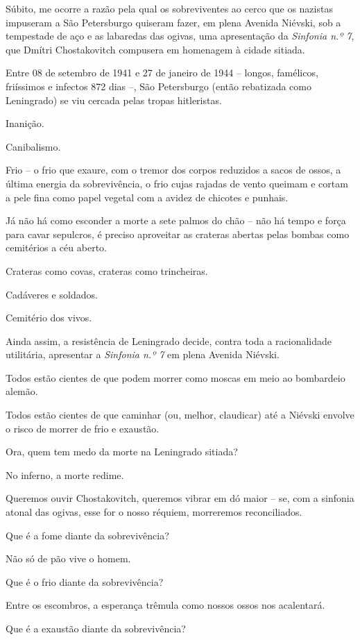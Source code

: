 Súbito, me ocorre a razão pela qual os sobreviventes ao cerco que os
nazistas impuseram a São Petersburgo quiseram fazer, em plena Avenida
Niévski, sob a tempestade de aço e as labaredas das ogivas, uma
apresentação da \emph{Sinfonia n.º 7}, que Dmítri Chostakovitch
compusera em homenagem à cidade sitiada.

Entre 08 de setembro de 1941 e 27 de janeiro de 1944 -- longos,
famélicos, friíssimos e infectos 872 dias --, São Petersburgo (então
rebatizada como Leningrado) se viu cercada pelas tropas hitleristas.

Inanição.

Canibalismo.

Frio -- o frio que exaure, com o tremor dos corpos reduzidos a sacos de
ossos, a última energia da sobrevivência, o frio cujas rajadas de vento
queimam e cortam a pele fina como papel vegetal com a avidez de chicotes
e punhais.

Já não há como esconder a morte a sete palmos do chão -- não há tempo e
força para cavar sepulcros, é preciso aproveitar as crateras abertas
pelas bombas como cemitérios a céu aberto.

Crateras como covas, crateras como trincheiras.

Cadáveres e soldados.

Cemitério dos vivos.

Ainda assim, a resistência de Leningrado decide, contra toda a
racionalidade utilitária, apresentar a \emph{Sinfonia n.º 7} em plena
Avenida Niévski.

Todos estão cientes de que podem morrer como moscas em meio ao
bombardeio alemão.

Todos estão cientes de que caminhar (ou, melhor, claudicar) até a
Niévski envolve o risco de morrer de frio e exaustão.

Ora, quem tem medo da morte na Leningrado sitiada?

No inferno, a morte redime.

Queremos ouvir Chostakovitch, queremos vibrar em dó maior -- se, com a
sinfonia atonal das ogivas, esse for o nosso réquiem, morreremos
reconciliados.

Que é a fome diante da sobrevivência?

Não só de pão vive o homem.

Que é o frio diante da sobrevivência?

Entre os escombros, a esperança trêmula como nossos ossos nos
acalentará.

Que é a exaustão diante da sobrevivência?

